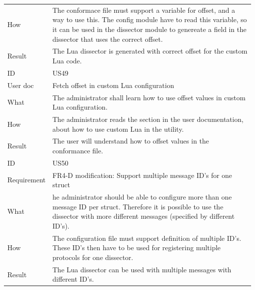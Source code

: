 \begin{table}[htbp]
{\begin{tabularx}{1.2\textwidth}{l X}
	How & The conformace file must support a variable for offset, and a way to use this. The config module have to read this variable, so it can be used in the dissector module to genereate a field in the dissector that uses the correct offset. \\
	Result & The Lua dissector is generated with correct offset for the custom Lua code. \\	
	\midrule
	ID & US49 \\
	User doc & Fetch offset in custom Lua configuration  \\
	What & The administrator shall learn how to use offset values in custom Lua configuration.   \\
	How & The administrator reads the section in the user documentation, about how to use custom Lua in the utility.   \\
	Result & The user will understand how to offset values in the conformance file. \\
	\midrule
	ID & US50 \\
	Requirement & FR4-D modification: Support multiple message ID's for one struct \\
	What & he administrator should be able to configure more than one message ID per struct. Therefore it is possible to use the dissector with more different messages (specified by different ID’s).    \\
	How & The configuration file must support definition of multiple ID’s. These ID’s then have to be used for registering multiple protocols for one dissector.  \\
	Result & The Lua dissector can be used with multiple messages with different ID’s. \\
	\bottomrule
\end{tabularx}}
\end{table}

